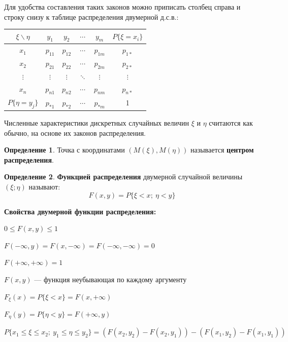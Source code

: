 \documentclass[12pt,a4paper]{article}
\newcommand{\deglistwithtitle}[2]{%
    \noindent\textbf{#1}\par\vspace{0.3em}
    \begin{deglist}
        #2
    \end{deglist}
}
\theoremstyle{definition}
\newtheorem{definition}{Определение}[section]
\theoremstyle{definition}
\theoremstyle{remark}
\theoremstyle{corollary}
\theoremstyle{bolditalic}
\begin{document}
Для удобства составления таких законов можно приписать столбец справа и строку снизу к таблице распределения двумерной д.с.в.:

    \begin{table}[h!]
\centering
\renewcommand{\arraystretch}{1.2}
\begin{tabular}{|c|c|c|c|c|c|}
\hline
$\xi \backslash \eta$ & $y_1$ & $y_2$ & $\cdots$ & $y_m$ & $P\{\xi=x_i\}$\\ 
\hline
$x_1$ & $p_{11}$ & $p_{12}$ & $\cdots$ & $p_{1m}$ & $p_{1*}$ \\ \hline
$x_2$ & $p_{21}$ & $p_{22}$ & $\cdots$ & $p_{2m}$ & $p_{2*}$  \\ \hline
$\vdots$ & $\vdots$ & $\vdots$ & $\ddots$ & $\vdots$ & $\vdots$\\ \hline
$x_n$ & $p_{n1}$ & $p_{n2}$ & $\cdots$ & $p_{nm}$ & $p_{n*}$ \\ \hline
$P\{\eta=y_j\}$ & $p_{*1}$ & $p_{*2}$ & $\cdots$ & $p_{*m}$ & 1\\ \hline
\end{tabular}
\end{table}

Численные характеристики дискретных случайных величин $\xi$ и $\eta$ считаются как обычно, на основе их законов распределения.

\begin{definition}
    Точка с координатами $(M(\xi), M(\eta))$ называется \textbf{центром распределения}.
\end{definition}

\begin{definition}
    \textbf{Функцией распределения} двумерной случайной величины $(\xi; \eta)$ называют:
    \[
    F(x, y) = P\{\xi<x;\ \eta<y\}
    \]
\end{definition}

\deglistwithtitle{Свойства двумерной функции распределения:}{
    \item $0 \le F(x, y) \le 1$
    \item $F(-\infty, y) = F(x, -\infty)=F(-\infty, -\infty)=0$
    \item $F(+\infty, +\infty)=1$
    \item $F(x, y)$ --- функция неубывающая по каждому аргументу
    \item $F_\xi(x)=P\{\xi<x\}=F(x,+\infty)$
    \item $F_\eta(y)=P\{\eta<y\}=F(+\infty, y)$
    \item $P\{x_1 \le \xi \le x_2;\ y_1\le \eta\le y_2\}=(F(x_2, y_2)-F(x_2, y_1))-(F(x_1, y_2) - F(x_1, y_1))$
}
\end{document}
